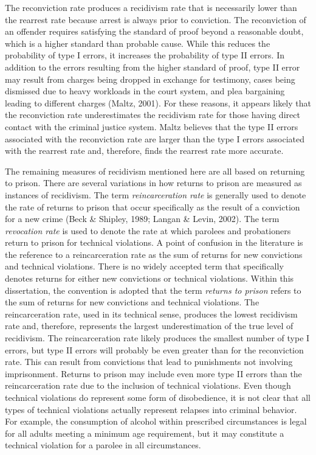 The reconviction rate produces a recidivism rate that is necessarily lower than the rearrest rate because arrest is always prior to conviction.  The reconviction of an offender requires satisfying the standard of proof beyond a reasonable doubt, which is a higher standard than probable cause.  While this reduces the probability of type I errors, it increases the probability of type II errors.  In addition to the errors resulting from the higher standard of proof, type II error may result from charges being dropped in exchange for testimony, cases being dismissed due to heavy workloads in the court system, and plea bargaining leading to different charges (Maltz, 2001).  For these reasons, it appears likely that the reconviction rate underestimates the recidivism rate for those having direct contact with the criminal justice system.  Maltz believes that the type II errors associated with the reconviction rate are larger than the type I errors associated with the rearrest rate and, therefore, finds the rearrest rate more accurate.

The remaining measures of recidivism mentioned here are all based on returning to prison.  There are several variations in how returns to prison are measured as instances of recidivism.  The term \emph{reincarceration rate} is generally used to denote the rate of returns to prison that occur specifically as the result of a conviction for a new crime (Beck \& Shipley, 1989; Langan \& Levin, 2002).  The term \emph{revocation rate} is used to denote the rate at which parolees and probationers return to prison for technical violations.  A point of confusion in the literature is the reference to a reincarceration rate as the sum of returns for new convictions and technical violations.  There is no widely accepted term that specifically denotes returns for either new convictions or technical violations.  Within this dissertation, the convention is adopted that the term \emph{returns to prison} refers to the sum of returns for new convictions and technical violations. The reincarceration rate, used in its technical sense, produces the lowest recidivism rate and, therefore, represents the largest underestimation of the true level of recidivism.  The reincarceration rate likely produces the smallest number of type I errors, but type II errors will probably be even greater than for the reconviction rate.  This can result from convictions that lead to punishments not involving imprisonment.  Returns to prison may include even more type II errors than the reincarceration rate due to the inclusion of technical violations.  Even though technical violations do represent some form of disobedience, it is not clear that all types of technical violations actually represent relapses into criminal behavior.  For example, the consumption of alcohol within prescribed circumstances is legal for all adults meeting a minimum age requirement, but it may constitute a technical violation for a parolee in all circumstances.

